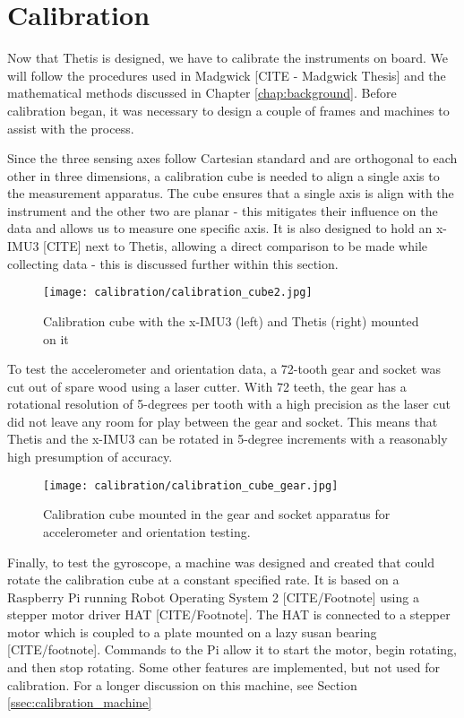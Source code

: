 \chapter{Calibration} \label{chap:calibration}
Now that Thetis is designed, we have to calibrate the instruments on board.
We will follow the procedures used in Madgwick [CITE - Madgwick Thesis] and the mathematical methods discussed in Chapter \ref{chap:background}.
Before calibration began, it was necessary to design a couple of frames and machines to assist with the process.

Since the three sensing axes follow Cartesian standard and are orthogonal to each other in three dimensions, a calibration cube is needed to align a single axis to the measurement apparatus.
The cube ensures that a single axis is align with the instrument and the other two are planar - this mitigates their influence on the data and allows us to measure one specific axis.
It is also designed to hold an x-IMU3 [CITE] next to Thetis, allowing a direct comparison to be made while collecting data - this is discussed further within this section.

\begin{figure}[h!]
    \centering
    \texttt{[image: calibration/calibration\_cube2.jpg]}
    \caption[Calibration cube]{Calibration cube with the x-IMU3 (left) and Thetis (right) mounted on it}
    \label{fig:calibration_cube}
\end{figure}

To test the accelerometer and orientation data, a 72-tooth gear and socket was cut out of spare wood using a laser cutter.
With 72 teeth, the gear has a rotational resolution of 5-degrees per tooth with a high precision as the laser cut did not leave any room for play between the gear and socket.
This means that Thetis and the x-IMU3 can be rotated in 5-degree increments with a reasonably high presumption of accuracy.

\begin{figure}[h!]
    \centering
    \texttt{[image: calibration/calibration\_cube\_gear.jpg]}
    \caption[Raw and Windowed Gyroscope Data]{Calibration cube mounted in the gear and socket apparatus for accelerometer and orientation testing.}
    \label{fig:calibration_cube_gear}
\end{figure}

Finally, to test the gyroscope, a machine was designed and created that could rotate the calibration cube at a constant specified rate.
It is based on a Raspberry Pi running Robot Operating System 2 [CITE/Footnote] using a stepper motor driver HAT [CITE/Footnote].
The HAT is connected to a stepper motor which is coupled to a plate mounted on a lazy susan bearing [CITE/footnote].
Commands to the Pi allow it to start the motor, begin rotating, and then stop rotating.
Some other features are implemented, but not used for calibration.
For a longer discussion on this machine, see Section \ref{ssec:calibration_machine}

